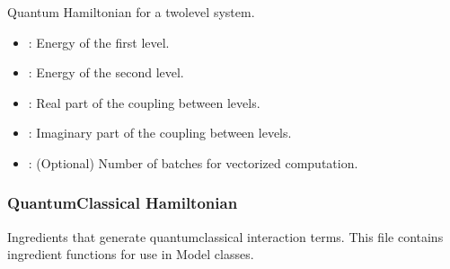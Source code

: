 \documentclass[letterpaper,10pt,english]{sphinxmanual}
\begin{document}
\begin{fulllineitems}
\label{\detokenize{software_reference/ingredients/ingredients:qc_lab.ingredients.two_level_system_h_q}}
\pysigstartsignatures
\pysiglinewithargsret
{}
{\sphinxparamcomma {}\sphinxparamcomma {}\sphinxparamcomma {}}
{}
\pysigstopsignatures
\sphinxAtStartPar
Quantum Hamiltonian for a two\sphinxhyphen{}level system.
\begin{description}
\begin{itemize}
\item {} 
\sphinxAtStartPar
{}: Energy of the first level.

\item {} 
\sphinxAtStartPar
{}: Energy of the second level.

\item {} 
\sphinxAtStartPar
{}: Real part of the coupling between levels.

\item {} 
\sphinxAtStartPar
{}: Imaginary part of the coupling between levels.

\end{itemize}

\begin{itemize}
\item {} 
\sphinxAtStartPar
{}: (Optional) Number of batches for vectorized computation.

\end{itemize}

\end{description}

\end{fulllineitems}



\subsubsection{Quantum\sphinxhyphen{}Classical Hamiltonian}
\label{\detokenize{software_reference/ingredients/ingredients:quantum-classical-hamiltonian}}
\sphinxAtStartPar
Ingredients that generate quantum\sphinxhyphen{}classical interaction terms.
\label{\detokenize{software_reference/ingredients/ingredients:module-0}}
\sphinxAtStartPar
This file contains ingredient functions for use in Model classes.
\end{document}
